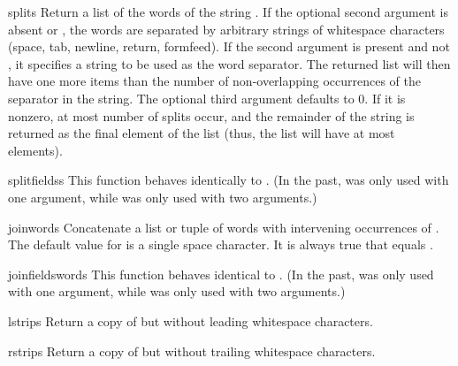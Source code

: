 \begin{funcdesc}{split}{s}
  Return a list of the words of the string .  If the optional
  second argument  is absent or , the words are
  separated by arbitrary strings of whitespace characters (space, tab, 
  newline, return, formfeed).  If the second argument  is
  present and not , it specifies a string to be used as the 
  word separator.  The returned list will then have one more items
  than the number of non-overlapping occurrences of the separator in
  the string.  The optional third argument  defaults to
  0.  If it is nonzero, at most  number of splits occur,
  and the remainder of the string is returned as the final element of
  the list (thus, the list will have at most 
  elements).
\end{funcdesc}

\begin{funcdesc}{splitfields}{s}
  This function behaves identically to .  (In the
  past,  was only used with one argument, while
   was only used with two arguments.)
\end{funcdesc}

\begin{funcdesc}{join}{words}
  Concatenate a list or tuple of words with intervening occurrences of 
  .  The default value for  is a single space
  character.  It is always true that
  equals .
\end{funcdesc}

\begin{funcdesc}{joinfields}{words}
  This function behaves identical to .  (In the past, 
   was only used with one argument, while
   was only used with two arguments.)
\end{funcdesc}

\begin{funcdesc}{lstrip}{s}
  Return a copy of  but without leading whitespace characters.
\end{funcdesc}

\begin{funcdesc}{rstrip}{s}
  Return a copy of  but without trailing whitespace
  characters.
\end{funcdesc}

